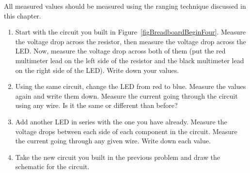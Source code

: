 
All measured values should be measured using the ranging technique discussed in this chapter.

\begin{enumerate}
\item Start with the circuit you built in Figure~\ref{figBreadboardBeginFour}.  Measure the voltage drop across the resistor, then measure the voltage drop across the LED.  Now, measure the voltage drop across both of them (put the red multimeter lead on the left side of the resistor and the black multimeter lead on the right side of the LED).  Write down your values.
\item Using the same circuit, change the LED from red to blue.   Measure the values again and write them down.  Measure the current going through the circuit using any wire.  Is it the same or different than before?
\item Add another LED in series with the one you have already.  Measure the voltage drops between each side of each component in the circuit.  Measure the current going through any given wire.  Write down each value.
\item Take the new circuit you built in the previous problem and draw the schematic for the circuit.
\end{enumerate}
